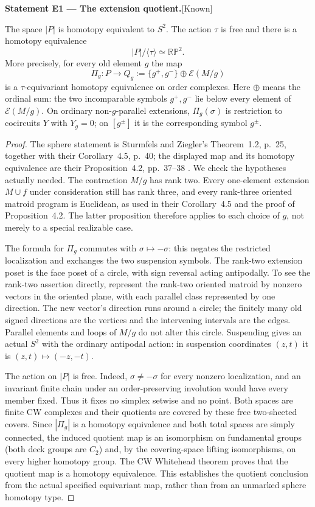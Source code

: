 \documentclass[11pt,a4paper]{article}
\newenvironment{resultenv}[3]{\par\medskip\phantomsection\label{#1}\noindent\textbf{Statement #1 --- #3.}\quad\textsf{[#2]}\par\smallskip\noindent\ignorespaces}{\par\medskip}
\begin{document}
\begin{resultenv}{E1}{Known}{The extension quotient}
The space $|P|$ is homotopy equivalent to $S^2$. The action $\tau$ is free and
there is a homotopy equivalence
\[
 |P|/\langle\tau\rangle\simeq\mathbb {RP}^{2}.
\]
More precisely, for every old element $g$ the map
\[
 \Pi_g:P\longrightarrow Q_g:=\{g^+,g^-\}\oplus\mathcal E(M/g)
\]
is a $\tau$-equivariant homotopy equivalence on order complexes. Here $\oplus$
means the ordinal sum: the two incomparable symbols $g^+,g^-$ lie below every
element of $\mathcal E(M/g)$. On ordinary non-$g$-parallel extensions,
$\Pi_g(\sigma)$ is restriction to cocircuits $Y$ with $Y_g=0$; on $[g^\pm]$
it is the corresponding symbol $g^\pm$.
\end{resultenv}
\begin{proof}
The sphere statement is Sturmfels and Ziegler's Theorem~1.2, p.~25, together
with their Corollary~4.5, p.~40; the displayed map and its homotopy equivalence
are their Proposition~4.2, pp.~37--38 \cite{SZ1993}. We check the
hypotheses actually needed. The contraction $M/g$ has rank two. Every
one-element extension $M\cup f$ under consideration still has rank three,
and every rank-three oriented matroid program is Euclidean, as used in their
Corollary~4.5 and the proof of Proposition~4.2. The latter proposition therefore
applies to each choice of $g$, not merely to a special realizable case.

The formula for $\Pi_g$ commutes with $\sigma\mapsto-\sigma$: this negates the
restricted localization and exchanges the two suspension symbols. The
rank-two extension poset is the face poset of a circle, with sign reversal
acting antipodally. To see the rank-two assertion directly, represent the
rank-two oriented matroid by nonzero vectors in the oriented plane, with each
parallel class represented by one direction. The new vector's direction runs
around a circle; the finitely many old signed directions are the vertices
and the intervening intervals are the edges. Parallel elements and loops of
$M/g$ do not alter this circle. Suspending gives an actual $S^2$ with the
ordinary antipodal action: in suspension coordinates $(z,t)$ it is
$(z,t)\mapsto(-z,-t)$.

The action on $|P|$ is free. Indeed, $\sigma\neq-\sigma$ for every nonzero
localization, and an invariant finite chain under an order-preserving
involution would have every member fixed. Thus it fixes no simplex setwise
and no point. Both spaces are finite CW complexes and their quotients are
covered by these free two-sheeted covers. Since $|\Pi_g|$ is a homotopy
equivalence and both total spaces are simply connected, the induced quotient
map is an isomorphism on fundamental groups (both deck groups are $C_2$) and,
by the covering-space lifting isomorphisms, on every higher homotopy group.
The CW Whitehead theorem proves that the quotient map is a homotopy
equivalence. This establishes the quotient conclusion from the actual
specified equivariant map, rather than from an unmarked sphere homotopy type.
\end{proof}
\end{document}
